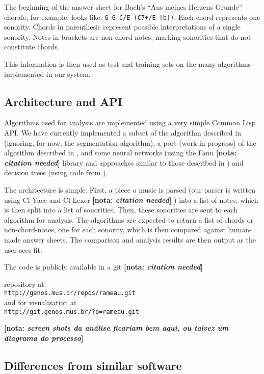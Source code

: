 \documentclass{article}
\newcommand{\nota}[1]{
  \textbf{[nota: \textit{#1}]}
}
\begin{document}
The beginning of the answer sheet for Bach's ``Aus meines Herzens
Grunde'' chorale, for example, looks like. \texttt{G G C/E (C7+/E
  [b])}. Each chord represents one sonority. Chords in parenthesis
represent possible interpretations of a single sonority. Notes in
brackets are non-chord-notes, marking sonorities that do not
constitute chords.

This information is then used as test and training sets on the many
algorithms implemented in our system.

\subsection{Architecture and API}
\label{sec:architecture-and-api}

Algorithms used for analysis are implemented using a very simple
Common Lisp API. We have currently implemented a subset of the
algorithm described in \cite{pardo02:algorithms} (ignoring, for now,
the segmentation algorithm), a port (work-in-progress) of the
algorithm described in \cite{temperley99:modeling}, and some neural
networks (using the Fann \nota{citation needed} library and approaches
similar to those described in
\cite{tsui02:_harmon_analy_using_neural_networ}) and decision trees
(using code from \cite{Mitchell:1997:ML}).

The architecture is simple. First, a piece o music is parsed (our
parser is written using Cl-Yacc and Cl-Lexer \nota{citation needed})
into a list of notes, which is then split into a list of
sonorities. Then, these sonorities are sent to each algorithm for
analysis. The algorithms are expected to return a list of chords or
non-chord-notes, one for each sonority, which is then compared against
human-made answer sheets. The comparison and analysis results are
then output as the user sees fit.

The code is publicly available in a git \nota{citation needed}
repository at:\\
\texttt{http://genos.mus.br/repos/rameau.git}\\
and for visualization at\\
\texttt{http://git.genos.mus.br/?p=rameau.git}

\nota{screen shots da análise ficariam bem aqui, ou talvez um diagrama
  do processo}

\subsection{Differences from similar software}
\label{sec:differences-from-similar-software}
\end{document}
